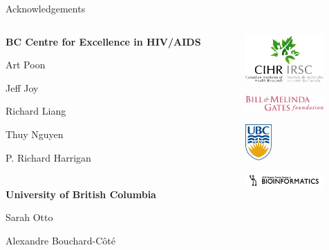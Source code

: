 \documentclass{beamer}
\begin{document}
\begin{frame}{Acknowledgements}
  \begin{columns}
    \begin{column}{0.6\textwidth}

      \textbf{BC Centre for Excellence in HIV/AIDS}

      Art Poon

      Jeff Joy

      Richard Liang

      Thuy Nguyen

      P. Richard Harrigan

      \hfill\\
      \textbf{University of British Columbia}

      Sarah Otto

      Alexandre Bouchard-C\^ot\'e

      \vfill
    \end{column}
    \begin{column}{0.4\textwidth}
      \centering 

      \includegraphics[width=3cm]{logos/cihr}
      \vspace{0.5cm}

      \includegraphics[width=3cm]{logos/bmgf}
      \vspace{0.5cm}

      \includegraphics[width=1cm]{logos/ubc}
      \vspace{0.5cm}

      \includegraphics[width=3cm]{logos/btp}
    \end{column}
  \end{columns}
\end{frame}
\end{document}
